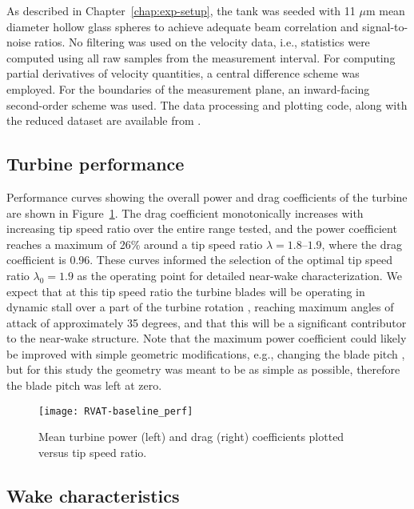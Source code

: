 As described in Chapter~\ref{chap:exp-setup}, the tank was seeded with 11 $\mu$m
mean diameter hollow glass spheres to achieve adequate beam correlation and
signal-to-noise ratios. No filtering was used on the velocity data, i.e.,
statistics were computed using all raw samples from the measurement interval.
For computing partial derivatives of velocity quantities, a central difference
scheme was employed. For the boundaries of the measurement plane, an
inward-facing second-order scheme was used. The data processing and plotting
code, along with the reduced dataset are available from
\cite{Bachant2014-RVAT-baseline}.


\subsection{Turbine performance}

Performance curves showing the overall power and drag coefficients of the
turbine are shown in Figure~\ref{fig:RVAT-baseline-perf}. The drag coefficient
monotonically increases with increasing tip speed ratio over the entire range
tested, and the power coefficient reaches a maximum of 26\% around a tip speed
ratio $\lambda=1.8$--$1.9$, where the drag coefficient is 0.96. These curves
informed the selection of the optimal tip speed ratio $\lambda_0 = 1.9$ as the
operating point for detailed near-wake characterization. We expect that at this
tip speed ratio the turbine blades will be operating in dynamic stall over a
part of the turbine rotation \cite{Scheurich2011}, reaching maximum angles of
attack of approximately 35 degrees, and that this will be a significant
contributor to the near-wake structure. Note that the maximum power coefficient
could likely be improved with simple geometric modifications, e.g., changing the
blade pitch \cite{Fiedler2009}, but for this study the geometry was meant to be
as simple as possible, therefore the blade pitch was left at zero.

\begin{figure}
    \centering
    \texttt{[image: RVAT-baseline\_perf]}
    \caption{Mean turbine power (left) and drag (right) coefficients plotted
        versus tip speed ratio.}
    \label{fig:RVAT-baseline-perf}
\end{figure}


\subsection{Wake characteristics}

